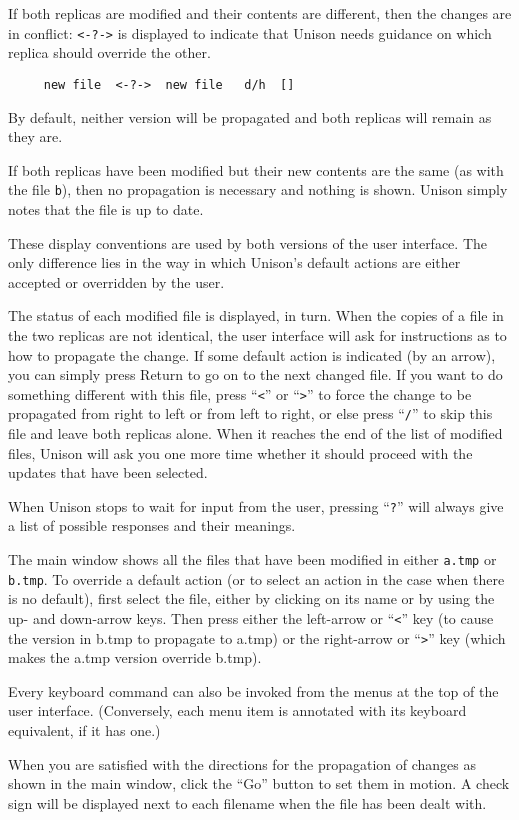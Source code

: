 \documentclass{article}
\begin{document}
If both replicas are modified and their contents are different, then
the changes are in conflict: \texttt{<-?->} is displayed to indicate
that Unison needs guidance on which replica should override the
other.  
\begin{verbatim}
     new file  <-?->  new file   d/h  []
\end{verbatim}
By default, neither version will be propagated and both
replicas will remain as they are.  

If both replicas have been modified but their new contents are the same
(as with the file {\tt b}), then no propagation is necessary and
nothing is shown.  Unison simply notes that the file is up to date.

These display conventions are used by both versions of the user
interface.  The only difference lies in the way in which Unison's
default actions are either accepted or overridden by the user.

\begin{textui}
The status of each modified file is displayed, in turn.  
When the copies of a file in the two replicas are not identical, the
user interface will ask for instructions as to how to propagate the
change.  If some default action is indicated (by an arrow), you can
simply press Return to go on to the next changed file.  If you want to
do something different with this file, press ``\verb|<|'' or ``\verb|>|'' to force
the change to be propagated from right to left or from left to right,
or else press ``\verb|/|'' to skip this file and leave both replicas alone.
When it reaches the end of the list of modified files, Unison will ask
you one more time whether it should proceed with the updates that have
been selected.

When Unison stops to wait for input from the user, pressing ``\verb|?|''
will always give a list of possible responses and their meanings.
\end{textui}

\begin{tkui}  
The main window shows all the files that have been modified in either
{\tt a.tmp} or {\tt b.tmp}.  To override a default action (or to select
an action in the case when there is no default), first select the file, either
by clicking on its name or by using the up- and down-arrow keys.  Then
press either the left-arrow or ``\verb|<|'' key (to cause the version in b.tmp to
propagate to a.tmp) or the right-arrow or ``\verb|>|'' key (which makes the a.tmp
version override b.tmp). 

Every keyboard command can also be invoked from the menus at the top
of the user interface.  (Conversely, each menu item is annotated with
its keyboard equivalent, if it has one.)

When you are satisfied with the directions for the propagation of changes
as shown in the main window, click the ``Go'' button to set them in
motion.  A check sign will be displayed next to each filename
when the file has been dealt with.
\end{tkui}
\end{document}

